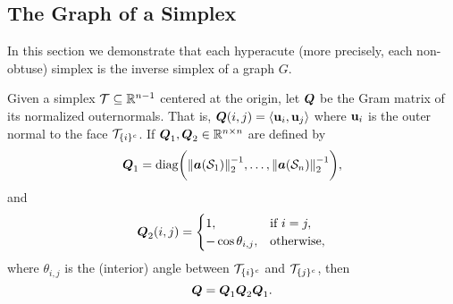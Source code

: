 \subsection{The Graph of a Simplex}
\label{sec:simplex_to_graph}
In this section we demonstrate that each hyperacute (more precisely, each non-obtuse) simplex is the inverse simplex of a graph $G$. 

\begin{lemma}
Given a simplex $\mathcal{T}\subseteq\mathbb{R}^{n-1}$ centered at the origin, let $\vb*{Q}$ be the Gram matrix of its normalized outernormals. That is, $\vb*{Q}(i,j)=\langle \vb{u}_i,\vb{u}_j\rangle$ where $\vb{u}_{i}$ is the outer normal to the face $\mathcal{T}_{\{i\}^c}$. If $\vb*{Q}_1,\vb*{Q}_2\in\mathbb{R}^{n\times n}$ are defined by 
\begin{equation*}
\vb*{Q}_1 = \text{diag}\bigg(\norm{\vb*{a}(\mathcal{S}_1)}_2^{-1},\dots,\norm{\vb*{a}(\mathcal{S}_n)}_2^{-1}\bigg),
\end{equation*}
and 
\begin{equation*}
\vb*{Q}_2(i,j) = \begin{cases}
1,& \text{if } i=j,\\
-\cos\theta_{i,j},&\text{otherwise},
\end{cases} 
\end{equation*}
where $\theta_{i,j}$ is the (interior) angle between $\mathcal{T}_{\{i\}^c}$ and $\mathcal{T}_{\{j\}^c}$, then 
\begin{equation*}
\vb*{Q} = \vb*{Q}_1 \vb*{Q}_2 \vb*{Q}_1.
\end{equation*}
\end{lemma}


